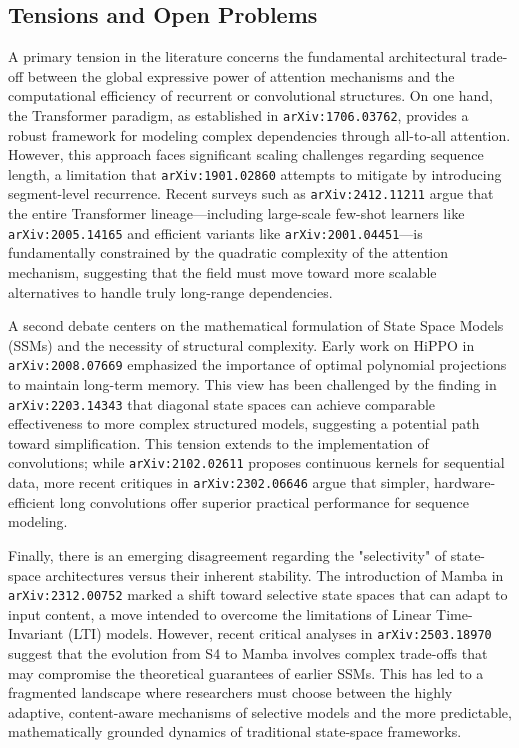 \documentclass[11pt]{article}
\begin{document}
\subsection{Tensions and Open Problems}

A primary tension in the literature concerns the fundamental architectural trade-off between the global expressive power of attention mechanisms and the computational efficiency of recurrent or convolutional structures. On one hand, the Transformer paradigm, as established in \texttt{arXiv:1706.03762}, provides a robust framework for modeling complex dependencies through all-to-all attention. However, this approach faces significant scaling challenges regarding sequence length, a limitation that \texttt{arXiv:1901.02860} attempts to mitigate by introducing segment-level recurrence. Recent surveys such as \texttt{arXiv:2412.11211} argue that the entire Transformer lineage—including large-scale few-shot learners like \texttt{arXiv:2005.14165} and efficient variants like \texttt{arXiv:2001.04451}—is fundamentally constrained by the quadratic complexity of the attention mechanism, suggesting that the field must move toward more scalable alternatives to handle truly long-range dependencies.

A second debate centers on the mathematical formulation of State Space Models (SSMs) and the necessity of structural complexity. Early work on HiPPO in \texttt{arXiv:2008.07669} emphasized the importance of optimal polynomial projections to maintain long-term memory. This view has been challenged by the finding in \texttt{arXiv:2203.14343} that diagonal state spaces can achieve comparable effectiveness to more complex structured models, suggesting a potential path toward simplification. This tension extends to the implementation of convolutions; while \texttt{arXiv:2102.02611} proposes continuous kernels for sequential data, more recent critiques in \texttt{arXiv:2302.06646} argue that simpler, hardware-efficient long convolutions offer superior practical performance for sequence modeling.

Finally, there is an emerging disagreement regarding the "selectivity" of state-space architectures versus their inherent stability. The introduction of Mamba in \texttt{arXiv:2312.00752} marked a shift toward selective state spaces that can adapt to input content, a move intended to overcome the limitations of Linear Time-Invariant (LTI) models. However, recent critical analyses in \texttt{arXiv:2503.18970} suggest that the evolution from S4 to Mamba involves complex trade-offs that may compromise the theoretical guarantees of earlier SSMs. This has led to a fragmented landscape where researchers must choose between the highly adaptive, content-aware mechanisms of selective models and the more predictable, mathematically grounded dynamics of traditional state-space frameworks.
\end{document}
